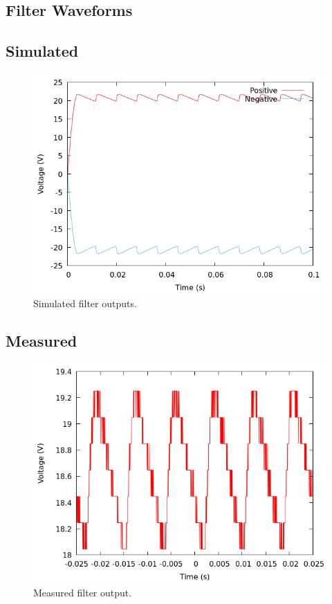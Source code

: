 \documentclass[12pt]{article}
\newcommand{\graphwidth}{0.5\linewidth}
\begin{document}
\begin{appendix}
\section{Filter Waveforms}

\subsection{Simulated}

\begin{figure}[H]
    \centering
    \includegraphics[width=\graphwidth]{./res/image/sim-filtered.png}
    \caption{Simulated filter outputs.}
    \label{sim:filtered}
\end{figure}

\subsection{Measured}

\begin{figure}[H]
    \centering
    \includegraphics[width=\graphwidth]{./res/image/rectifier-withload.png}
    \caption{Measured filter output.}
    \label{fig:filtered}
\end{figure}


\end{appendix}
\end{document}
